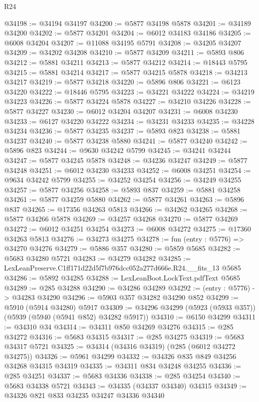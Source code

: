 \begin{lexlean}{R24}
\begin{coremodule}
@34198 := @34194 @34197
@34200 := @5877 @34198 @5878
@34201 := @34189 @34200
@34202 := @5877 @34201
@34204 := @6012 @34183 @34186
@34205 := @6008 @34204
@34207 := @11088 @34195 @5791
@34208 := @34205 @34207
@34209 := @34202 @34208
@34210 := @5877 @34209
@34211 := @5893 @806
@34212 := @5881 @34211
@34213 := @5877 @34212
@34214 := @18443 @5795
@34215 := @5881 @34214
@34217 := @5877 @34215 @5878
@34218 := @34213 @34217
@34219 := @5877 @34218
@34220 := @5896 @806
@34221 := @6123 @34220
@34222 := @18446 @5795
@34223 := @34221 @34222
@34224 := @34219 @34223
@34226 := @5877 @34224 @5878
@34227 := @34210 @34226
@34228 := @5877 @34227
@34230 := @6012 @34204 @34207
@34231 := @6008 @34230
@34233 := @6127 @34220 @34222
@34234 := @34231 @34233
@34235 := @34228 @34234
@34236 := @5877 @34235
@34237 := @5893 @823
@34238 := @5881 @34237
@34240 := @5877 @34238 @5880
@34241 := @5877 @34240
@34242 := @5896 @823
@34244 := @9630 @34242 @5799
@34245 := @34241 @34244
@34247 := @5877 @34245 @5878
@34248 := @34236 @34247
@34249 := @5877 @34248
@34251 := @6012 @34230 @34233
@34252 := @6008 @34251
@34254 := @9634 @34242 @5799
@34255 := @34252 @34254
@34256 := @34249 @34255
@34257 := @5877 @34256
@34258 := @5893 @837
@34259 := @5881 @34258
@34261 := @5877 @34259 @5880
@34262 := @5877 @34261
@34263 := @5896 @837
@34265 := @17356 @34263 @5813
@34266 := @34262 @34265
@34268 := @5877 @34266 @5878
@34269 := @34257 @34268
@34270 := @5877 @34269
@34272 := @6012 @34251 @34254
@34273 := @6008 @34272
@34275 := @17360 @34263 @5813
@34276 := @34273 @34275
@34278 := fun (entry : @5776) => @34270 @34276
@34279 := @5886 @357
@34280 := @5859 @5685
@34282 := @5683 @34280 @5721
@34283 := @34279 @34282
@34285 := LexLeanPreserve.C1ff171d22d5f7b976dcc052a277d666e.R24.__fits_13 @5685
@34286 := @5892 @34285
@34288 := LexLeanBoot.LockText.pdfText @5685
@34289 := @285 @34288
@34290 := @34286 @34289
@34292 := (entry : @5776) -> @34283 @34290
@34296 := @5903 @357 @34282 @34290 @852
@34299 := @5910 (@5914 @34280) @5917
@34309 := @34296 @34299 (@5923 (@5933 @357)) (@5939 (@5940 (@5941 @852) @34282 @5917))
@34310 := @6150 @34299
@34311 := @34310 @34
@34314 := @34311 @850 @34269 @34276
@34315 := @285 @34272
@34316 := @5683 @34315
@34317 := @285 @34275
@34319 := @5683 @34317 @5721
@34325 := @34314 (@34316 @34319) (@285 (@6012 @34272 @34275))
@34326 := @5961 @34299
@34332 := @34326 @835 @849 @34256 @34268 @34315 @34319
@34335 := @34311 @834 @34248 @34255
@34336 := @285 @34251
@34337 := @5683 @34336
@34338 := @285 @34254
@34340 := @5683 @34338 @5721
@34343 := @34335 (@34337 @34340) @34315
@34349 := @34326 @821 @833 @34235 @34247 @34336 @34340

\end{coremodule}
\end{lexlean}
